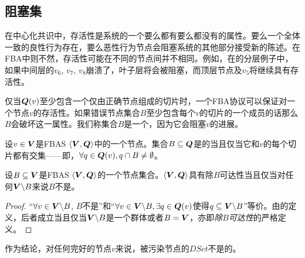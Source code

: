\subsection{阻塞集}
在中心化共识中，存活性是系统的一个要么都有要么都没有的属性。要么一个全体一致的良性行为{\quorum}存在，要么恶性行为节点会阻塞系统的其他部分接受新的陈述。在FBA中则不然，存活性可能在不同的节点间并不相同。例如，在的分层{\quorum}例子中，如果中间层的$v_6$, $v_7$, $v_8$崩溃了，叶子层将会被阻塞，而顶层节点及$v_5$将继续具有存活性。

仅当${\bm Q}(v)$至少包含一个仅由正确节点组成的{\quorum}切片时，一个FBA协议可以保证对一个节点$v$的存活性。如果错误节点集合$B$至少包含每个$v$的切片的一个成员的话那么$B$会破坏这一属性。我们称集合$B$是一个{\vblock}，因为它会阻塞$v$的进展。

\begin{definition}[{\vblock}]
        设$v\in {\bm V}$是FBAS $\langle{\bm V},{\bm Q}\rangle$中的一个节点。集合$B\subseteq {\bm Q}$是{\vblock}的当且仅当它和$v$的每个切片都有交集——即，$\forall q\in {\bm Q}(v),q\cap B\neq \emptyset$。
\end{definition}

\begin{theorem}\label{th7}
        设$B\subseteq {\bm V}$是FBAS $\langle{\bm V},{\bm Q}\rangle$的一个节点集合。$\langle{\bm V},{\bm Q}\rangle$具有除$B${\quorum}可达性当且仅当对任何${\bm V}\backslash B$来说$B$不是{\vblock}。
\end{theorem}

\begin{proof}
        ``$\forall v\in {\bm V}\backslash B$, $B$不是{\vblock}''和``$\forall v\in{\bm V}\backslash B, \exists q\in {\bm Q}(v)$使得$q\subseteq {\bm V}\backslash B$''等价。由{\quorum}的定义，后者成立当且仅当${\bm V}\backslash B$是一个群体或者$B={\bm V}$，亦即\textit{除$B${\quorum}可达性}的严格定义。
\end{proof}

作为结论，对任何完好的节点$v$来说，被污染节点的$DSet$不是{\vblock}的。
